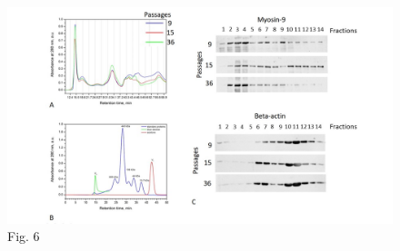 \documentclass[alpha-refs]{wiley-article}
\begin{document}
\begin{figure}[hbt!]
\centering
\includegraphics[width=1\linewidth]{fplc.jpg}
\caption{Fig. 6}
\end{figure}
\end{document}
